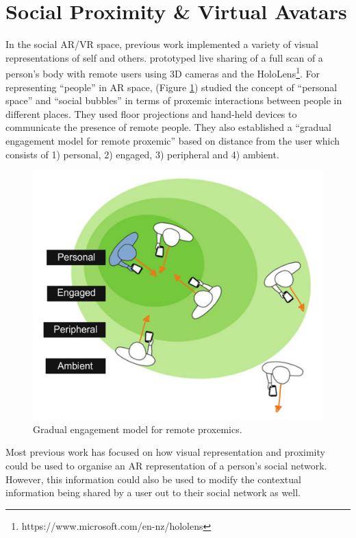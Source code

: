 \section{Social Proximity \& Virtual Avatars}

In the social AR/VR space, previous work implemented a variety of visual representations of self and others. \cite{Fanello2016} prototyped live sharing of a full scan of a person's body with remote users using 3D cameras and the HoloLens\footnote{https://www.microsoft.com/en-nz/hololens}. For representing “people” in AR space, \cite{Sousa2016} (Figure \ref{fig:Sousa2016}) studied the concept of \enquote{personal space} and \enquote{social bubbles} in terms of proxemic interactions between people in different places. They used floor projections and hand-held devices to communicate the presence of remote people. They also established a \enquote{gradual engagement model for remote proxemic} based on distance from the user which consists of 1) personal, 2) engaged, 3) peripheral and 4) ambient.

\begin{figure}
    \centering
    \includegraphics[width=.8\linewidth]{images/Sousa2016.PNG}
    \caption{Gradual engagement model for remote proxemics. \cite{Sousa2016}}
    \label{fig:Sousa2016}
\end{figure}

Most previous work has focused on how visual representation and proximity could be used to organise an AR representation of a person's social network. However, this information could also be used to modify the contextual information being shared by a user out to their social network as well. 

